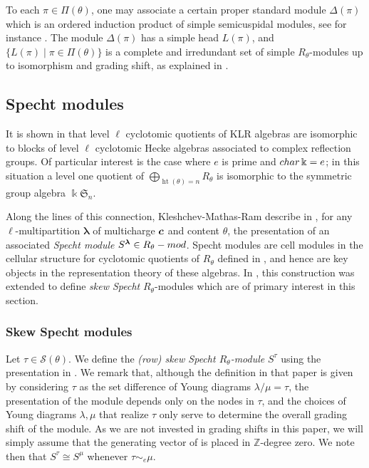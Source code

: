 \documentclass[Unicode,ALCO]{cedram}
\def\bc{\text{\boldmath$c$}}
\newcommand{\height}{\operatorname{ht}}
\newcommand{\SSSS}{\mathcal{S}}
\newcommand{\0}{{\bar 0}}
\newcommand{\ZZ}{{\mathbb Z}}
\newcommand{\blam}{\boldsymbol{\lambda}}
\def\height{{\operatorname{ht}}}
\def\k{\Bbbk}
\def\height{{\operatorname{ht}}}
\begin{document}
To each \(\pi \in \Pi(\theta)\), one may associate a certain proper standard module \(\Delta(\pi)\) which is an ordered induction product of simple semicuspidal modules, see for instance \cite[(6.5)]{KlMuStrat}. The module \(\Delta(\pi)\) has a simple head \(L(\pi)\), and 
\(
\{ L(\pi) \mid \pi \in \Pi(\theta)\}
\)
is a complete and irredundant set of simple \(R_\theta\)-modules up to isomorphism and grading shift, as explained in \cite{KlCuspSys, McNRepKLR3, TiWebMirk, KlMuStrat}.




\subsection{Specht modules}\label{Spechtmodsec}
It is shown in \cite{BrKlBloCyc} that level \(\ell\) cyclotomic quotients of KLR algebras are isomorphic to blocks of level \(\ell\) cyclotomic Hecke algebras associated to complex reflection groups. Of particular interest is the case where \(e\) is prime and \(\textup{char} \,\k = e\); in this situation a level one quotient of \(\bigoplus_{\height(\theta) = n} R_\theta\) is isomorphic to the symmetric group algebra \(\k \mathfrak{S}_{n}\). 

Along the lines of this connection, Kleshchev-Mathas-Ram describe in \cite{KMRUnivSpecht}, for any \(\ell\)-multipartition \(\blam\) of multicharge \(\bc\) and content \(\theta\), the presentation of an associated {\em Specht module} \(S^{\blam} \in R_\theta\textup{-mod}\). Specht modules are cell modules in the cellular structure for cyclotomic quotients of \(R_\theta\) defined in \cite{HuMaCell}, and hence are key objects in the representation theory of these algebras.
In \cite{MuSkew}, this construction was extended to define {\em skew Specht} \(R_\theta\)-modules which are of primary interest in this section.



\subsubsection{Skew Specht modules}
Let \(\tau \in \SSSS(\theta)\). We define the {\em (row) skew Specht \(R_\theta\)-module} \(S^\tau\) using the presentation in \cite[Definition~4.5]{MuSkew}. We remark that, although the definition in that paper is given by considering \(\tau\) as the set difference of Young diagrams \(\lambda /\mu = \tau\), the presentation of the module depends only on the nodes in \(\tau\), and the choices of Young diagrams \(\lambda, \mu\) that realize \(\tau\) only serve to determine the overall grading shift of the module. As we are not invested in grading shifts in this paper, we will simply assume that the generating vector of \cite[Definition~4.5]{MuSkew} is placed in \(\ZZ\)-degree zero. We note then that \(S^\tau \cong S^\mu\) whenever \(\tau \sim_e \mu\).
\end{document}
